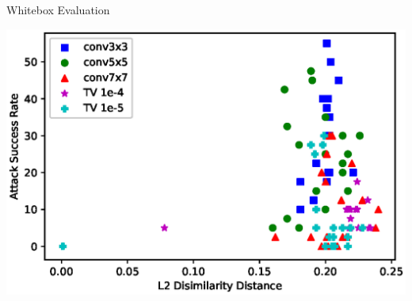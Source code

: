 \documentclass{beamer}
\begin{document}
\begin{frame}{Whitebox Evaluation}
\begin{center}
	\includegraphics[scale=0.6]{L2vsAttkplot.eps}
\end{center}
\end{frame}
\end{document}
